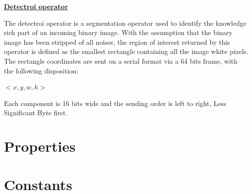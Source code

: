 \documentclass[12pt,a4paper]{article}
\begin{document}
\begin{center}
\textbf{\huge  \underline{Detectroi operator}}
\end{center}
\vspace{0.5cm}

The detectroi operator is a segmentation operator used to identify the knowledge rich part of an incoming binary image. With the assumption that the binary image has been stripped of all noises, the region of interest returned by this operator is defined as the smallest rectangle containing all the image white pixels.\\

The rectangle coordinates are sent on a serial format via a 64 bits frame, with the following disposition: \\
\begin{center}
$<x,y,w,h>$\\
\end{center}
Each component is 16 bits wide and the sending order is left to right, Less Significant Byte first.

\begin{figure}[h!]
\centering
{}
\end{figure}


\section*{Properties}

\vspace{0.5cm}

\section*{Constants}

\end{document}
